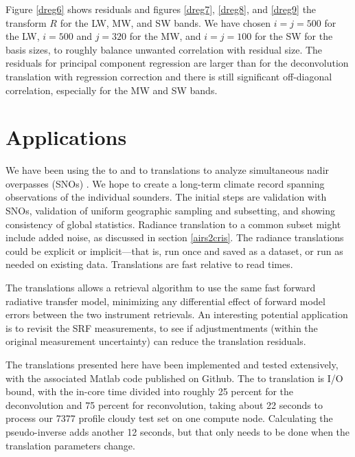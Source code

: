 \documentclass[10pt,twocolumn]{article}
\begin{document}
Figure \ref{dreg6} shows residuals and figures \ref{dreg7},
\ref{dreg8}, and \ref{dreg9} the transform $R$ for the {\cris} LW,
MW, and SW bands.  We have chosen $i = j = 500$ for the LW, $i =
500$ and $j = 320$ for the MW, and $i = j = 100$ for the SW for the
basis sizes, to roughly balance unwanted correlation with residual
size.  The residuals for principal component regression are larger
than for the deconvolution translation with regression correction
and there is still significant off-diagonal correlation, especially
for the MW and SW bands.

\section{Applications}  
\label{appcon}

We have been using the {\airs} to {\cris} and {\iasi} to {\cris}
translations to analyze simultaneous nadir overpasses (SNOs)
\cite{sno1}.  We hope to create a long-term climate record spanning
observations of the individual sounders.  The initial steps are
validation with SNOs, validation of uniform geographic sampling and
subsetting, and showing consistency of global statistics.  Radiance
translation to a common subset might include added noise, as
discussed in section \ref{airs2cris}.  The radiance translations
could be explicit or implicit---that is, run once and saved as a
dataset, or run as needed on existing data.  Translations are fast
relative to read times.

The translations allows a retrieval algorithm to use the same fast
forward radiative transfer model, minimizing any differential effect
of forward model errors between the two instrument retrievals.
An interesting potential application is to revisit the {\airs} SRF
measurements, to see if adjustmentments (within the original
measurement uncertainty) can reduce the translation residuals.

The translations presented here have been implemented and tested
extensively, with the associated Matlab code published on Github.
The {\airs} to {\cris} translation is I/O bound, with the in-core
time divided into roughly 25 percent for the deconvolution and 75
percent for reconvolution, taking about 22 seconds to process our
7377 profile cloudy test set on one compute node.  Calculating the
pseudo-inverse adds another 12 seconds, but that only needs to be
done when the translation parameters change.
\end{document}
